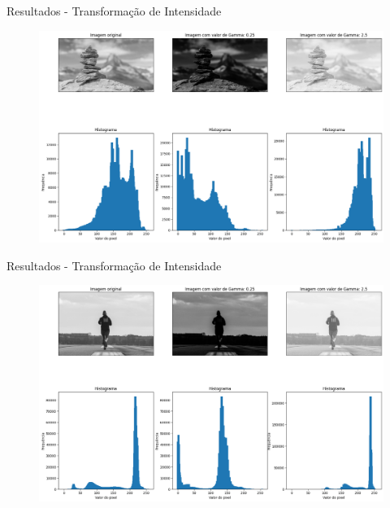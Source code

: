 \documentclass[]{beamer}
\begin{document}
\begin{frame}{Resultados - Transformação de Intensidade}
    \begin{figure}
        \includegraphics[scale=0.25]{Imagens/resultados-gamma-cairn.png}
    \end{figure}  
\end{frame}

\begin{frame}{Resultados - Transformação de Intensidade}
    \begin{figure}
        \includegraphics[scale=0.25]{Imagens/resultados-gamma-runner.png}
    \end{figure}  
\end{frame}
\end{document}
